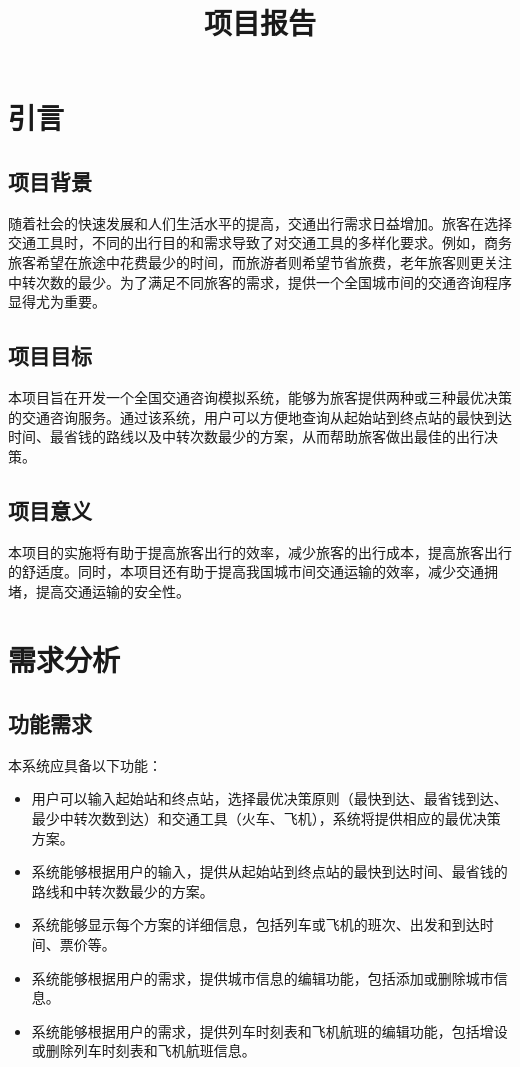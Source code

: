 \documentclass[10pt]{article}
\title{项目报告}
\begin{document}

    \tableofcontents
    \newpage


    \section{引言}

    \subsection{项目背景}

    随着社会的快速发展和人们生活水平的提高，交通出行需求日益增加。旅客在选择交通工具时，不同的出行目的和需求导致了对交通工具的多样化要求。例如，商务旅客希望在旅途中花费最少的时间，而旅游者则希望节省旅费，老年旅客则更关注中转次数的最少。为了满足不同旅客的需求，提供一个全国城市间的交通咨询程序显得尤为重要。

    \subsection{项目目标}
    本项目旨在开发一个全国交通咨询模拟系统，能够为旅客提供两种或三种最优决策的交通咨询服务。通过该系统，用户可以方便地查询从起始站到终点站的最快到达时间、最省钱的路线以及中转次数最少的方案，从而帮助旅客做出最佳的出行决策。

    \subsection{项目意义}
    本项目的实施将有助于提高旅客出行的效率，减少旅客的出行成本，提高旅客出行的舒适度。同时，本项目还有助于提高我国城市间交通运输的效率，减少交通拥堵，提高交通运输的安全性。


    \section{需求分析}

    \subsection{功能需求}
    本系统应具备以下功能：

    \begin{itemize}
        \item 用户可以输入起始站和终点站，选择最优决策原则（最快到达、最省钱到达、最少中转次数到达）和交通工具（火车、飞机），系统将提供相应的最优决策方案。
        \item 系统能够根据用户的输入，提供从起始站到终点站的最快到达时间、最省钱的路线和中转次数最少的方案。
        \item 系统能够显示每个方案的详细信息，包括列车或飞机的班次、出发和到达时间、票价等。
        \item 系统能够根据用户的需求，提供城市信息的编辑功能，包括添加或删除城市信息。
        \item 系统能够根据用户的需求，提供列车时刻表和飞机航班的编辑功能，包括增设或删除列车时刻表和飞机航班信息。
    \end{itemize}
\end{document}
